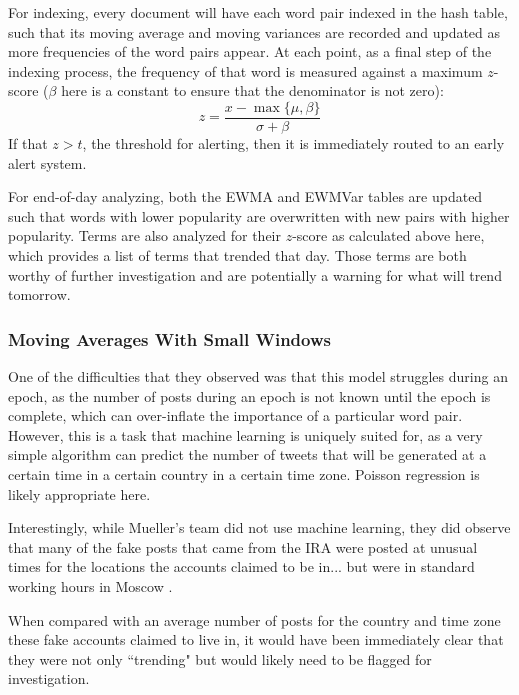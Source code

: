 \documentclass[preprint,review,12pt]{elsarticle}
\begin{document}
For indexing, every document will have each word pair indexed in the hash table, such that its moving average and moving variances are recorded and updated as more frequencies of the word pairs appear. At each point, as a final step of the indexing process, the frequency of that word is measured against a maximum $z$-score ($\beta$ here is a constant to ensure that the denominator is not zero):
\begin{equation}
    z = \frac{x-\max\{\mu, \beta\}}{\sigma + \beta}
\end{equation}
If that $z > t$, the threshold for alerting, then it is immediately routed to an early alert system.

For end-of-day analyzing, both the EWMA and EWMVar tables are updated such that words with lower popularity are overwritten with new pairs with higher popularity. Terms are also analyzed for their $z$-score as calculated above here, which provides a list of terms that trended that day. Those terms are both worthy of further investigation and are potentially a warning for what will trend tomorrow.

\subsubsection{Moving Averages With Small Windows}
One of the difficulties that they observed was that this model struggles during an epoch, as the number of posts during an epoch is not known until the epoch is complete, which can over-inflate the importance of a particular word pair. However, this is a task that machine learning is uniquely suited for, as a very simple algorithm can predict the number of tweets that will be generated at a certain time in a certain country in a certain time zone. Poisson regression is likely appropriate here.

Interestingly, while Mueller's team did not use machine learning, they did observe that many of the fake posts that came from the IRA were posted at unusual times for the locations the accounts claimed to be in... but were in standard working hours in Moscow \cite{mueller2020internet}.

When compared with an average number of posts for the country and time zone these fake accounts claimed to live in, it would have been immediately clear that they were not only ``trending" but would likely need to be flagged for investigation.
\end{document}
